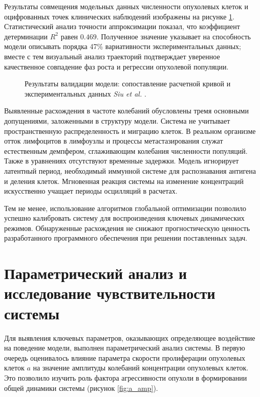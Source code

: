 Результаты совмещения модельных данных численности опухолевых клеток и оцифрованных
точек клинических наблюдений изображены на рисунке \ref{fig:validation_plot}.
Статистический анализ точности аппроксимации показал, что коэффициент
детерминации $R^2$ равен $0.469$. Полученное значение указывает на способность
модели описывать порядка 47\% вариативности экспериментальных данных; вместе с
тем визуальный анализ траекторий подтверждает уверенное качественное совпадение
фаз роста и регрессии опухолевой популяции.

\begin{figure}[ht!]
  \centering
  
  \caption{Результаты валидации модели: сопоставление расчетной кривой и
  экспериментальных данных \textit{Siu et al.} \cite{Siu1986}.}
  \label{fig:validation_plot}
\end{figure}

Выявленные расхождения в частоте колебаний обусловлены тремя основными
допущениями, заложенными в структуру модели. Система не учитывает
пространственную распределенность и миграцию клеток. В реальном организме отток
лимфоцитов в лимфоузлы и процессы метастазирования служат естественным
демпфером, сглаживающим колебания численности популяций. Также в уравнениях
отсутствуют временные задержки. Модель игнорирует латентный период, необходимый
иммунной системе для распознавания антигена и деления клеток. Мгновенная
реакция системы на изменение концентраций искусственно учащает периоды
осцилляций в расчетах.

Тем не менее, использование алгоритмов глобальной оптимизации позволило успешно
калибровать систему для воспроизведения ключевых динамических режимов.
Обнаруженные расхождения не снижают прогностическую ценность разработанного программного
обеспечения при решении поставленных задач.

\section{Параметрический анализ и исследование чувствительности системы}

Для выявления ключевых параметров, оказывающих определяющее воздействие на
поведение модели, выполнен параметрический анализ системы. В первую очередь
оценивалось влияние параметра скорости пролиферации опухолевых клеток $a$ на
значение амплитуды колебаний концентрации опухолевых клеток. Это позволило
изучить роль фактора агрессивности опухоли в формировании общей
динамики системы (рисунок \ref{fig:a_amp}).

